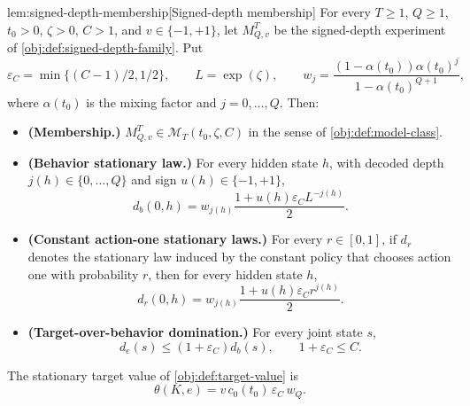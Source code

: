 \documentclass[11pt]{article}
\begin{document}
\begin{lemmav}{lem:signed-depth-membership}[Signed-depth membership]
For every \(T\ge 1\), \(Q\ge 1\), \(t_0>0\), \(\zeta>0\), \(C>1\), and \(v\in\{-1,+1\}\), let \(M_{Q,v}^T\) be the signed-depth experiment of \cref{obj:def:signed-depth-family}.  Put
\[
\varepsilon_C=\min\{(C-1)/2,1/2\},
\qquad
L=\exp(\zeta),
\qquad
w_j=\frac{(1-\alpha(t_0))\alpha(t_0)^j}{1-\alpha(t_0)^{Q+1}},
\]
where \(\alpha(t_0)\) is the mixing factor and \(j=0,\ldots,Q\).  Then:
\begin{itemize}
\item \textbf{(Membership.)} \(M_{Q,v}^T\in \mathcal M_T(t_0,\zeta,C)\) in the sense of \cref{obj:def:model-class}.
\item \textbf{(Behavior stationary law.)} For every hidden state \(h\), with decoded depth \(j(h)\in\{0,\ldots,Q\}\) and sign \(u(h)\in\{-1,+1\}\),
\[
d_b(0,h)
=
w_{j(h)}
\frac{1+u(h)\varepsilon_C L^{-j(h)}}{2}.
\]
\item \textbf{(Constant action-one stationary laws.)} For every \(r\in[0,1]\), if \(d_r\) denotes the stationary law induced by the constant policy that chooses action one with probability \(r\), then for every hidden state \(h\),
\[
d_r(0,h)
=
w_{j(h)}
\frac{1+u(h)\varepsilon_C r^{j(h)}}{2}.
\]
\item \textbf{(Target-over-behavior domination.)} For every joint state \(s\),
\[
d_e(s)\le (1+\varepsilon_C)d_b(s),
\qquad
1+\varepsilon_C\le C.
\]
\end{itemize}
The stationary target value of \cref{obj:def:target-value} is
\[
\theta(K,e)
=
v\,c_0(t_0)\,\varepsilon_C\,w_Q .
\]
\end{lemmav}
\end{document}
